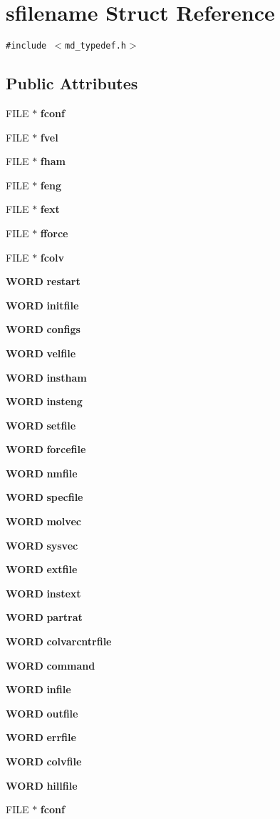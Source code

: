 \section{sfilename Struct Reference}
\label{structsfilename}
{\tt \#include $<$md\_\-typedef.h$>$}

\subsection*{Public Attributes}
\begin{CompactItemize}
\item 
FILE $\ast$ {\bf fconf}
\item 
FILE $\ast$ {\bf fvel}
\item 
FILE $\ast$ {\bf fham}
\item 
FILE $\ast$ {\bf feng}
\item 
FILE $\ast$ {\bf fext}
\item 
FILE $\ast$ {\bf fforce}
\item 
FILE $\ast$ {\bf fcolv}
\item 
{\bf WORD} {\bf restart}
\item 
{\bf WORD} {\bf initfile}
\item 
{\bf WORD} {\bf configs}
\item 
{\bf WORD} {\bf velfile}
\item 
{\bf WORD} {\bf instham}
\item 
{\bf WORD} {\bf insteng}
\item 
{\bf WORD} {\bf setfile}
\item 
{\bf WORD} {\bf forcefile}
\item 
{\bf WORD} {\bf nmfile}
\item 
{\bf WORD} {\bf specfile}
\item 
{\bf WORD} {\bf molvec}
\item 
{\bf WORD} {\bf sysvec}
\item 
{\bf WORD} {\bf extfile}
\item 
{\bf WORD} {\bf instext}
\item 
{\bf WORD} {\bf partrat}
\item 
{\bf WORD} {\bf colvarcntrfile}
\item 
{\bf WORD} {\bf command}
\item 
{\bf WORD} {\bf infile}
\item 
{\bf WORD} {\bf outfile}
\item 
{\bf WORD} {\bf errfile}
\item 
{\bf WORD} {\bf colvfile}
\item 
{\bf WORD} {\bf hillfile}
\item 
FILE $\ast$ {\bf fconf}
\end{CompactItemize}


